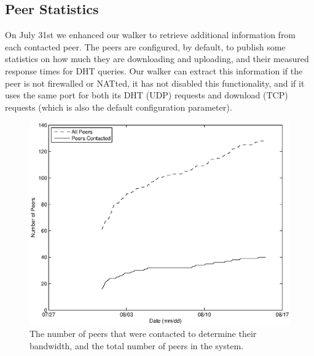 \documentclass[conference]{IEEEtran}
\begin{document}
%

\subsection{Peer Statistics}
\label{peer_stats}

On July 31st we enhanced our walker to retrieve additional
information from each contacted peer. The peers are configured, by
default, to publish some statistics on how much they are downloading
and uploading, and their measured response times for DHT queries.
Our walker can extract this information if the peer is not
firewalled or NATted, it has not disabled this functionality, and if
it uses the same port for both its DHT (UDP) requests and download
(TCP) requests (which is also the default configuration parameter).

\begin{figure}
\centering
\includegraphics[width=0.80\columnwidth]{AptP2PDownloaded-peers.eps}
\caption{The number of peers that were contacted to determine their
bandwidth, and the total number of peers in the system.}
\label{down_peers}
\end{figure}
\end{document}
